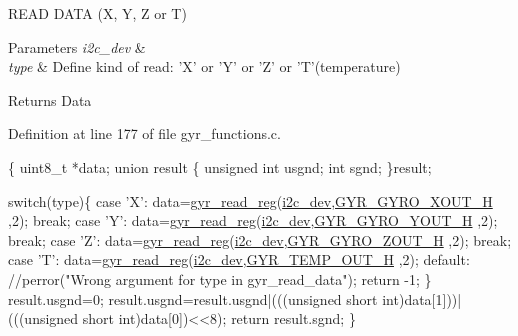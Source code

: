 R\-E\-A\-D D\-A\-T\-A (X, Y, Z or T) 


\begin{DoxyParams}{Parameters}
{\em i2c\-\_\-dev} & \\
\hline
{\em type} & Define kind of read\-: 'X' or 'Y' or 'Z' or 'T'(temperature) \\
\hline
\end{DoxyParams}
\begin{DoxyReturn}{Returns}
Data 
\end{DoxyReturn}


Definition at line 177 of file gyr\-\_\-functions.\-c.


\begin{DoxyCode}
\{
  uint8\_t *data;
  \textcolor{keyword}{union }result
  \{
    \textcolor{keywordtype}{unsigned} \textcolor{keywordtype}{int} usgnd;
    \textcolor{keywordtype}{int} sgnd;
  \}result;

  \textcolor{keywordflow}{switch}(type)\{
    \textcolor{keywordflow}{case} \textcolor{charliteral}{'X'}:
      data=\hyperlink{group__gyr_gad817a3b69d4c3026b7a9b6de32753e7b}{gyr\_read\_reg}(\hyperlink{CommunicationV0_2communication_8c_a7751bd45ac1064efb35adf1f19c25db8}{i2c\_dev},\hyperlink{communication_2imu__regs_8h_a45d3d3c92328dd02072aae7d8cf14ad0}{GYR\_GYRO\_XOUT\_H}
      ,2);
      \textcolor{keywordflow}{break};
    \textcolor{keywordflow}{case} \textcolor{charliteral}{'Y'}:
      data=\hyperlink{group__gyr_gad817a3b69d4c3026b7a9b6de32753e7b}{gyr\_read\_reg}(\hyperlink{CommunicationV0_2communication_8c_a7751bd45ac1064efb35adf1f19c25db8}{i2c\_dev},\hyperlink{communication_2imu__regs_8h_a7664c10b8291231d44694e154c218fab}{GYR\_GYRO\_YOUT\_H}
      ,2);
      \textcolor{keywordflow}{break};
    \textcolor{keywordflow}{case} \textcolor{charliteral}{'Z'}:
      data=\hyperlink{group__gyr_gad817a3b69d4c3026b7a9b6de32753e7b}{gyr\_read\_reg}(\hyperlink{CommunicationV0_2communication_8c_a7751bd45ac1064efb35adf1f19c25db8}{i2c\_dev},\hyperlink{communication_2imu__regs_8h_ae4d2753664f152db1bef259f99975b4c}{GYR\_GYRO\_ZOUT\_H}
      ,2);
      \textcolor{keywordflow}{break};
    \textcolor{keywordflow}{case} \textcolor{charliteral}{'T'}:
      data=\hyperlink{group__gyr_gad817a3b69d4c3026b7a9b6de32753e7b}{gyr\_read\_reg}(\hyperlink{CommunicationV0_2communication_8c_a7751bd45ac1064efb35adf1f19c25db8}{i2c\_dev},\hyperlink{communication_2imu__regs_8h_a7d00eaf1ea076429433ad0c787b48200}{GYR\_TEMP\_OUT\_H}
      ,2);
    \textcolor{keywordflow}{default}:
      \textcolor{comment}{//perror("Wrong argument for type in gyr\_read\_data");}
      \textcolor{keywordflow}{return} -1;
  \}
  result.usgnd=0;
  result.usgnd=result.usgnd|(((\textcolor{keywordtype}{unsigned} \textcolor{keywordtype}{short} int)data[1]))|(((\textcolor{keywordtype}{unsigned} \textcolor{keywordtype}{short} \textcolor{keywordtype}{
      int})data[0])<<8);
  \textcolor{keywordflow}{return} result.sgnd;
\}
\end{DoxyCode}
